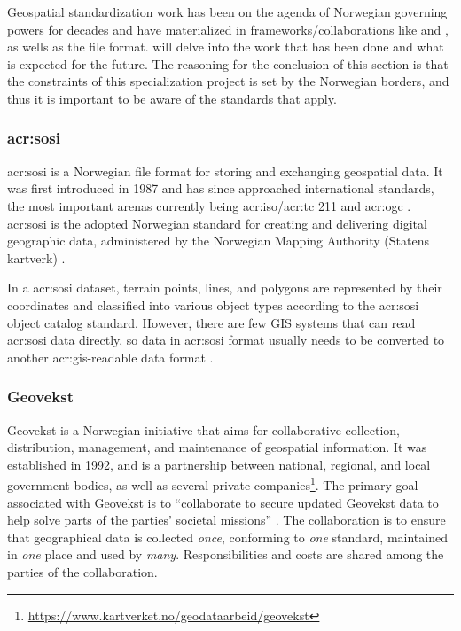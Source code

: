Geospatial standardization work has been on the agenda of Norwegian governing powers for decades and have materialized in frameworks/collaborations like  and , as wells as the  file format.  will delve into the work that has been done and what is expected for the future. The reasoning for the conclusion of this section is that the constraints of this specialization project is set by the Norwegian borders, and thus it is important to be aware of the standards that apply.

\subsubsection[SOSI]{\acrshort{acr:sosi}}\label{subsubsec:sosi}

\gls{acr:sosi} is a Norwegian file format for storing and exchanging geospatial data. It was first introduced in 1987 and has since approached international standards, the most important arenas currently being \acrshort{acr:iso}/\acrshort{acr:tc} 211 and \gls{acr:ogc} \citep{mardalNasjonalStrategiVidereutvikling2015}. \gls{acr:sosi} is the adopted Norwegian standard for creating and delivering digital geographic data, administered by the Norwegian Mapping Authority (Statens kartverk) \citep{maehlumSOSI2023}.

In a \gls{acr:sosi} dataset, terrain points, lines, and polygons are represented by their coordinates and classified into various object types according to the \gls{acr:sosi} object catalog standard. However, there are few GIS systems that can read \gls{acr:sosi} data directly, so data in \gls{acr:sosi} format usually needs to be converted to another \gls{acr:gis}-readable data format \citep{maehlumSOSI2023}.

\subsubsection{Geovekst}\label{subsubsec:geovekst}

Geovekst is a Norwegian initiative that aims for collaborative collection, distribution, management, and maintenance of geospatial information. It was established in 1992, and is a partnership between national, regional, and local government bodies, as well as several private companies\footnote{\url{https://www.kartverket.no/geodataarbeid/geovekst}}. The primary goal associated with Geovekst is to \enquote{collaborate to secure updated Geovekst data to help solve parts of the parties' societal missions} \citep[5]{thenorwegianmappingauthorityHandbokGeovekstsamarbeidet2023}. The collaboration is to ensure that geographical data is collected \textit{once}, conforming  to \textit{one} standard, maintained in \textit{one} place and used by \textit{many}. Responsibilities and costs are shared among the parties of the collaboration.

